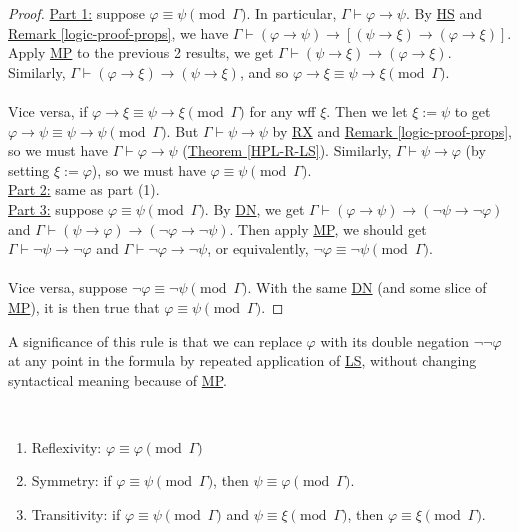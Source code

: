 \documentclass{treatise}
\begin{document}
\begin{proof}
\underline{Part 1:} suppose $\varphi \equiv \psi \pmod{\Gamma}$. In particular, $\Gamma \vdash \varphi \to \psi$. By \hyperref[HPL-T-HS]{HS} and \hyperref[logic-proof-props]{Remark \ref*{logic-proof-props}}, we have $\Gamma \vdash (\varphi \to \psi) \to [(\psi \to \xi) \to (\varphi \to \xi)]$. Apply \hyperref[HPL-R-MP]{MP} to the previous 2 results, we get $\Gamma \vdash (\psi \to \xi) \to (\varphi \to \xi)$. Similarly, $\Gamma \vdash (\varphi \to \xi) \to (\psi \to \xi)$, and so $\varphi \to \xi \equiv \psi \to \xi \pmod{\Gamma}$.
\\
\\
Vice versa, if $\varphi \to \xi \equiv \psi \to \xi \pmod{\Gamma}$ for any wff $\xi$. Then we let $\xi := \psi$ to get $\varphi \to \psi \equiv \psi \to \psi \pmod{\Gamma}$. But $\Gamma \vdash \psi \to \psi$ by \hyperref[HPL-T-RX]{RX} and \hyperref[logic-proof-props]{Remark \ref*{logic-proof-props}}, so we must have $\Gamma \vdash \varphi \to \psi$ (\hyperref[HPL-R-LS]{Theorem \ref*{HPL-R-LS}}). Similarly, $\Gamma \vdash \psi \to \varphi$ (by setting $\xi := \varphi$), so we must have $\varphi \equiv \psi \pmod{\Gamma}$.
\\
\underline{Part 2:} same as part (1).
\\
\underline{Part 3:} suppose $\varphi \equiv \psi \pmod{\Gamma}$. By \hyperref[HPL-T-DN]{DN}, we get $\Gamma \vdash (\varphi \to \psi) \to (\neg \psi \to \neg \varphi)$ and $\Gamma \vdash (\psi \to \varphi) \to (\neg \varphi \to \neg \psi)$. Then apply \hyperref[HPL-R-MP]{MP}, we should get $\Gamma \vdash \neg \psi \to \neg \varphi$ and $\Gamma \vdash \neg \varphi \to \neg \psi$, or equivalently, $\neg \varphi \equiv \neg \psi \pmod{\Gamma}$.
\\
\\
Vice versa, suppose $\neg \varphi \equiv \neg \psi \pmod{\Gamma}$. With the same \hyperref[HPL-T-DN]{DN} (and some slice of \hyperref[HPL-R-MP]{MP}), it is then true that $\varphi \equiv \psi \pmod{\Gamma}$.
\end{proof}
\begin{remark}
A significance of this rule is that we can replace $\varphi$ with its double negation $\neg \neg \varphi$ at any point in the formula by repeated application of \hyperref[HPL-R-LS]{LS}, without changing syntactical meaning because of \hyperref[HPL-R-MP]{MP}.
\end{remark}
\begin{proposition} \label{HPL-T-EQUIV} \
\begin{enumerate}
    \item Reflexivity: $\varphi \equiv \varphi \pmod{\Gamma}$
    \item Symmetry: if $\varphi \equiv \psi \pmod{\Gamma}$, then $\psi \equiv \varphi \pmod{\Gamma}$.
    \item Transitivity: if $\varphi \equiv \psi \pmod{\Gamma}$ and $\psi \equiv \xi \pmod{\Gamma}$, then $\varphi \equiv \xi \pmod{\Gamma}$.
\end{enumerate}
\end{proposition}
\end{document}
